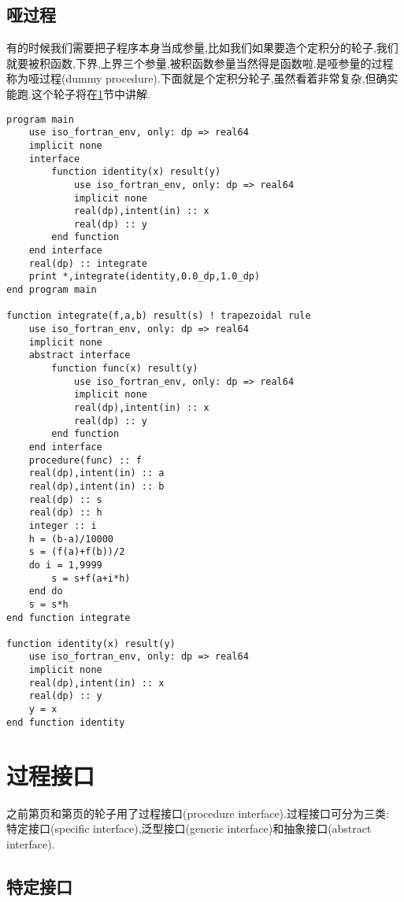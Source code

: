 \subsection{哑过程}
有的时候我们需要把子程序本身当成参量,比如我们如果要造个定积分的轮子,我们就要被积函数,下界,上界三个参量,被积函数参量当然得是函数啦.是哑参量的过程称为哑过程(dummy procedure).下面就是个定积分轮子,虽然看着非常复杂,但确实能跑.这个轮子将在\ref{fortran_interface}节中讲解.\label{dummy_procedure_program}
\begin{lstlisting}
program main
    use iso_fortran_env, only: dp => real64
    implicit none
    interface
        function identity(x) result(y)
            use iso_fortran_env, only: dp => real64
            implicit none
            real(dp),intent(in) :: x
            real(dp) :: y
        end function
    end interface
    real(dp) :: integrate
    print *,integrate(identity,0.0_dp,1.0_dp)
end program main

function integrate(f,a,b) result(s) ! trapezoidal rule
    use iso_fortran_env, only: dp => real64
    implicit none
    abstract interface
        function func(x) result(y)
            use iso_fortran_env, only: dp => real64
            implicit none
            real(dp),intent(in) :: x
            real(dp) :: y
        end function
    end interface
    procedure(func) :: f
    real(dp),intent(in) :: a
    real(dp),intent(in) :: b
    real(dp) :: s
    real(dp) :: h
    integer :: i
    h = (b-a)/10000
    s = (f(a)+f(b))/2
    do i = 1,9999
        s = s+f(a+i*h)
    end do
    s = s*h
end function integrate

function identity(x) result(y)
    use iso_fortran_env, only: dp => real64
    implicit none
    real(dp),intent(in) :: x
    real(dp) :: y
    y = x
end function identity
\end{lstlisting}

\section{过程接口}\label{fortran_interface}

之前第\pageref{assumed-shape_array_program}页和第\pageref{dummy_procedure_program}页的轮子用了过程接口(procedure interface).过程接口可分为三类: 特定接口(specific interface),泛型接口(generic interface)和抽象接口(abstract interface).

\subsection{特定接口}


